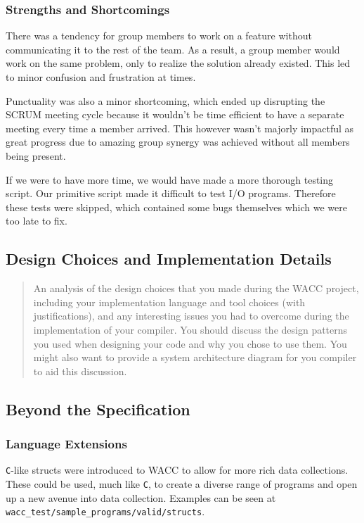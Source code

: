 \documentclass[a4paper,12pt]{article}
\newcommand{\shell}[1]{\lstinline!#1!}
\begin{document}
\subsubsection*{Strengths and Shortcomings}

There was a tendency for group members to work on a feature without communicating it to the rest of the team. As a result, a group member would work on the same problem, only to realize the solution already existed. This led to minor confusion and frustration at times.

Punctuality was also a minor shortcoming, which ended up disrupting the SCRUM meeting cycle because it wouldn't be time efficient to have a separate meeting every time a member arrived. This however wasn't majorly impactful as great progress due to amazing group synergy was achieved without all members being present.

If we were to have more time, we would have made a more thorough testing script. Our primitive script made it difficult to test I/O programs. Therefore these tests were skipped, which contained some bugs themselves which we were too late to fix.

\subsection*{Design Choices and Implementation Details}

\begin{quote}
    An analysis of the design choices that you
made during the WACC project, including your implementation language and tool choices (with
justifications), and any interesting issues you had to overcome during the implementation of your
compiler. You should discuss the design patterns you used when designing your code and why you
chose to use them. You might also want to provide a system architecture diagram for you compiler
to aid this discussion.
\end{quote}

\subsection*{Beyond the Specification}

\subsubsection*{Language Extensions}

\shell{C}-like structs were introduced to WACC to allow for more rich data collections. These could be used, much like \shell{C}, to create a diverse range of programs and open up a new avenue into data collection. Examples can be seen at \shell{wacc_test/sample_programs/valid/structs}.
\end{document}
